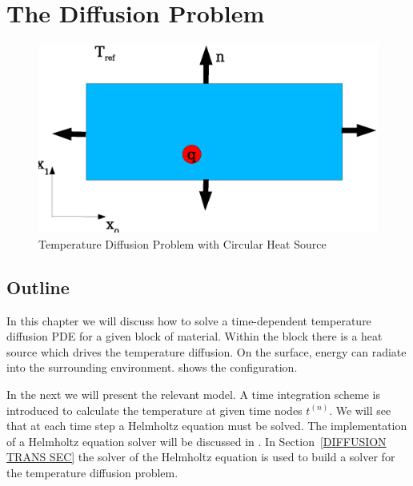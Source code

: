 %
%
%
%
%
%

\section{The Diffusion Problem}
\label{DIFFUSION CHAP}

\begin{figure}
\centerline{\includegraphics[width=\figwidth]{figures/DiffusionDomain.eps}}
\caption{Temperature Diffusion Problem with Circular Heat Source}
\label{DIFFUSION FIG 1}
\end{figure}

\subsection{\label{DIFFUSION OUT SEC}Outline}
In this chapter we will discuss how to solve a time-dependent temperature diffusion PDE for
a given block of material. Within the block there is a heat source which drives the temperature diffusion.
On the surface, energy can radiate into the surrounding environment.
 shows the configuration.

In the next  we will present the relevant model. A 
time integration scheme is introduced to calculate the temperature at given time nodes $t^{(n)}$. 
We will see that at each time step a Helmholtz equation  
must be solved. 
The implementation of a Helmholtz equation solver will be discussed in . 
In Section~\ref{DIFFUSION TRANS SEC} the solver of the Helmholtz equation is used to build a
solver for the temperature diffusion problem. 


